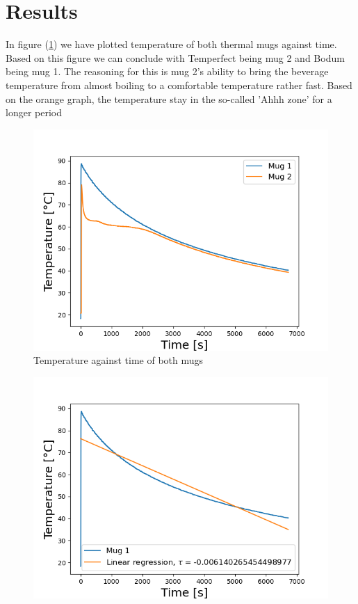 \documentclass[reprint,english,notitlepage]{revtex4-2}
\begin{document}
\section{Results}
In figure (\ref{fig:temperature}) we have plotted temperature of both thermal mugs against time. Based on this figure we can conclude with Temperfect being mug 2 and Bodum being mug 1. The reasoning for this is mug 2's ability to bring the beverage temperature from almost boiling to a comfortable temperature rather fast. Based on the orange graph, the temperature stay in the so-called 'Ahhh zone' for a longer period
\begin{figure}
  \includegraphics[scale=0.5]{temp.png}
  \caption{Temperature against time of both mugs}\label{fig:temperature}
\end{figure}
\FloatBarrier


\begin{figure}
  \includegraphics[scale=0.5]{tau_t.png}
  \caption{}\label{fig:tau_t}
\end{figure}
\FloatBarrier
\end{document}
